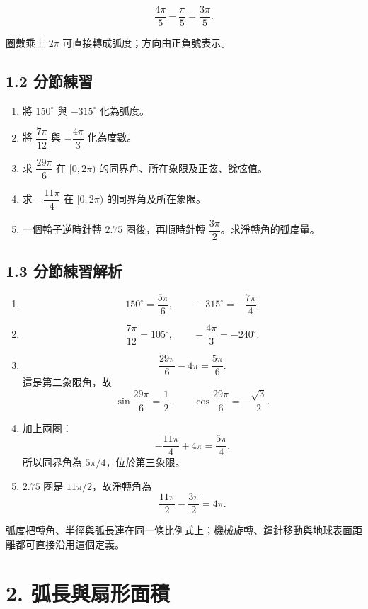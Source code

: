 \documentclass[11pt,a4paper]{article}
\providecommand{\tightlist}{%
  \setlength{\itemsep}{0pt}\setlength{\parskip}{0pt}}
\begin{document}
\[
\frac{4\pi}{5}-\frac{\pi}{5}=\frac{3\pi}{5}.
\]

圈數乘上 \(2\pi\) 可直接轉成弧度；方向由正負號表示。

\subsection{1.2 分節練習}\label{ux5206ux7bc0ux7df4ux7fd2}

\begin{enumerate}
\def\labelenumi{\arabic{enumi}.}
\tightlist
\item
  將 \(150^\circ\) 與 \(-315^\circ\) 化為弧度。
\item
  將 \(\dfrac{7\pi}{12}\) 與 \(-\dfrac{4\pi}{3}\) 化為度數。
\item
  求 \(\dfrac{29\pi}{6}\) 在 \([0,2\pi)\) 的同界角、所在象限及正弦、餘弦值。
\item
  求 \(-\dfrac{11\pi}{4}\) 在 \([0,2\pi)\) 的同界角及所在象限。
\item
  一個輪子逆時針轉 \(2.75\) 圈後，再順時針轉 \(\dfrac{3\pi}{2}\)。求淨轉角的弧度量。
\end{enumerate}

\subsection{1.3 分節練習解析}\label{ux5206ux7bc0ux7df4ux7fd2ux89e3ux6790}

\begin{enumerate}
\def\labelenumi{\arabic{enumi}.}
\tightlist
\item
  \[150^\circ=\frac{5\pi}{6},\qquad -315^\circ=-\frac{7\pi}{4}.\]
\item
  \[\frac{7\pi}{12}=105^\circ,\qquad -\frac{4\pi}{3}=-240^\circ.\]
\item
  \[\frac{29\pi}{6}-4\pi=\frac{5\pi}{6}.\]
  這是第二象限角，故
  \[\sin\frac{29\pi}{6}=\frac12,\qquad
  \cos\frac{29\pi}{6}=-\frac{\sqrt3}{2}.\]
\item
  加上兩圈：
  \[-\frac{11\pi}{4}+4\pi=\frac{5\pi}{4}.\]
  所以同界角為 \(5\pi/4\)，位於第三象限。
\item
  \(2.75\) 圈是 \(11\pi/2\)，故淨轉角為
  \[\frac{11\pi}{2}-\frac{3\pi}{2}=4\pi.\]
\end{enumerate}

弧度把轉角、半徑與弧長連在同一條比例式上；機械旋轉、鐘針移動與地球表面距離都可直接沿用這個定義。

\section{2. 弧長與扇形面積}\label{ux5f27ux9577ux8207ux6247ux5f62ux9762ux7a4d}
\end{document}
